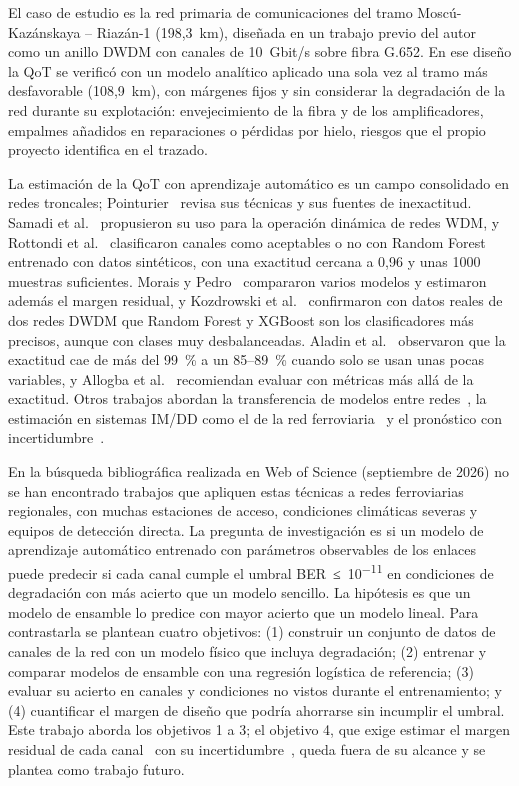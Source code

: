 \documentclass[runningheads]{llncs}
\begin{document}
El caso de estudio es la red primaria de comunicaciones del tramo Moscú-Kazánskaya – Riazán-1 (198,3~km), diseñada en un trabajo previo del autor~\cite{acosta2026tfg} como un anillo DWDM con canales de 10~Gbit/s sobre fibra G.652. En ese diseño la QoT se verificó con un modelo analítico aplicado una sola vez al tramo más desfavorable (108,9~km), con márgenes fijos y sin considerar la degradación de la red durante su explotación: envejecimiento de la fibra y de los amplificadores, empalmes añadidos en reparaciones o pérdidas por hielo, riesgos que el propio proyecto identifica en el trazado.

La estimación de la QoT con aprendizaje automático es un campo consolidado en redes troncales; Pointurier~\cite{pointurier2021} revisa sus técnicas y sus fuentes de inexactitud. Samadi et al.~\cite{samadi2017} propusieron su uso para la operación dinámica de redes WDM, y Rottondi et al.~\cite{rottondi2018} clasificaron canales como aceptables o no con Random Forest entrenado con datos sintéticos, con una exactitud cercana a 0,96 y unas 1000 muestras suficientes. Morais y Pedro~\cite{morais2018} compararon varios modelos y estimaron además el margen residual, y Kozdrowski et al.~\cite{kozdrowski2021} confirmaron con datos reales de dos redes DWDM que Random Forest y XGBoost son los clasificadores más precisos, aunque con clases muy desbalanceadas. Aladin et al.~\cite{aladin2020} observaron que la exactitud cae de más del 99~\% a un 85–89~\% cuando solo se usan unas pocas variables, y Allogba et al.~\cite{allogba2022} recomiendan evaluar con métricas más allá de la exactitud. Otros trabajos abordan la transferencia de modelos entre redes~\cite{yu2019}, la estimación en sistemas IM/DD como el de la red ferroviaria~\cite{igarashi2024} y el pronóstico con incertidumbre~\cite{dicicco2023}.

En la búsqueda bibliográfica realizada en Web of Science (septiembre de 2026) no se han encontrado trabajos que apliquen estas técnicas a redes ferroviarias regionales, con muchas estaciones de acceso, condiciones climáticas severas y equipos de detección directa. La pregunta de investigación es si un modelo de aprendizaje automático entrenado con parámetros observables de los enlaces puede predecir si cada canal cumple el umbral BER~≤~10\textsuperscript{−11} en condiciones de degradación con más acierto que un modelo sencillo. La hipótesis es que un modelo de ensamble lo predice con mayor acierto que un modelo lineal. Para contrastarla se plantean cuatro objetivos: (1) construir un conjunto de datos de canales de la red con un modelo físico que incluya degradación; (2) entrenar y comparar modelos de ensamble con una regresión logística de referencia; (3) evaluar su acierto en canales y condiciones no vistos durante el entrenamiento; y (4) cuantificar el margen de diseño que podría ahorrarse sin incumplir el umbral. Este trabajo aborda los objetivos 1 a 3; el objetivo 4, que exige estimar el margen residual de cada canal~\cite{morais2018} con su incertidumbre~\cite{dicicco2023}, queda fuera de su alcance y se plantea como trabajo futuro.
\end{document}
